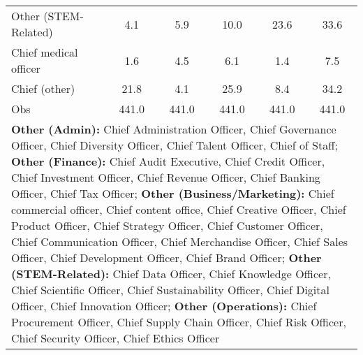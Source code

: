 \begin{table}[htbp]
\begin{tabular}{l*{5}{c}}
Other (STEM-Related)&         4.1&         5.9&        10.0&        23.6&        33.6\\
Chief medical officer&         1.6&         4.5&         6.1&         1.4&         7.5\\
Chief (other)       &        21.8&         4.1&        25.9&         8.4&        34.2\\
Obs                 &       441.0&       441.0&       441.0&       441.0&       441.0\\
\bottomrule
\multicolumn{6}{l}{\footnotesize \textbf{Other (Admin):} Chief Administration Officer, Chief Governance Officer, Chief Diversity Officer, Chief Talent Officer, Chief of Staff; \textbf{Other (Finance):} Chief Audit Executive, Chief Credit Officer, Chief Investment Officer, Chief Revenue Officer, Chief Banking Officer, Chief Tax Officer; \textbf{Other (Business/Marketing):} Chief commercial officer, Chief content office, Chief Creative Officer, Chief Product Officer, Chief Strategy Officer, Chief Customer Officer, Chief Communication Officer, Chief Merchandise Officer, Chief Sales Officer, Chief Development Officer, Chief Brand Officer; \textbf{Other (STEM-Related): } Chief Data Officer, Chief Knowledge Officer, Chief Scientific Officer, Chief Sustainability Officer, Chief Digital Officer, Chief Innovation Officer; \textbf{Other (Operations): } Chief Procurement Officer, Chief Supply Chain Officer, Chief Risk Officer, Chief Security Officer, Chief Ethics Officer}\\
\end{tabular}
\end{table}
